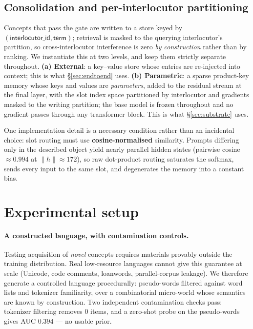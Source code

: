 \documentclass[11pt]{article}
\begin{document}
\subsection{Consolidation and per-interlocutor partitioning}
\label{sec:consolidation}

Concepts that pass the gate are written to a store keyed by
$(\textsf{interlocutor\_id}, \textsf{term})$; retrieval is masked to the querying
interlocutor's partition, so cross-interlocutor interference is zero \emph{by construction}
rather than by ranking. We instantiate this at two levels, and keep them strictly separate
throughout. \textbf{(a) External}: a key--value store whose entries are re-injected into
context; this is what \S\ref{sec:endtoend} uses. \textbf{(b) Parametric}: a sparse
product-key memory whose keys and values are \emph{parameters}, added to the residual
stream at the final layer, with the slot index space partitioned by interlocutor and
gradients masked to the writing partition; the base model is frozen throughout and no
gradient passes through any transformer block. This is what \S\ref{sec:substrate} uses.

One implementation detail is a necessary condition rather than an incidental choice: slot
routing must use \textbf{cosine-normalised} similarity. Prompts differing only in the
described object yield nearly parallel hidden states (pairwise cosine $\approx 0.994$ at
$\lVert h \rVert \approx 172$), so raw dot-product routing saturates the softmax, sends
every input to the same slot, and degenerates the memory into a constant bias.

\section{Experimental setup}

\paragraph{A constructed language, with contamination controls.}
Testing acquisition of \emph{novel} concepts requires materials provably outside the
training distribution. Real low-resource languages cannot give this guarantee at scale
(Unicode, code comments, loanwords, parallel-corpus leakage). We therefore generate a
controlled language procedurally: pseudo-words filtered against word lists and tokenizer
familiarity, over a combinatorial micro-world whose semantics are known by construction.
Two independent contamination checks pass: tokenizer filtering removes $0$ items, and a
zero-shot probe on the pseudo-words gives AUC $0.394$ --- no usable prior.
\end{document}
